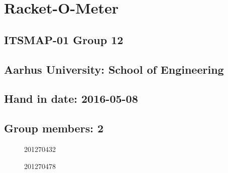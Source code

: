 \chapter*{Racket-O-Meter}

\section*{ITSMAP-01 Group 12}
\section*{Aarhus University: School of Engineering}

\section*{Hand in date: 2016-05-08}

\section*{Group members: 2}

\begin{figure}[b]
	\center
	\signature{Bjørn Sørensen}{201270432}
	\signature{Jesper Oddershede Christensen}{201270478}
	\vspace{4cm}
\end{figure}
